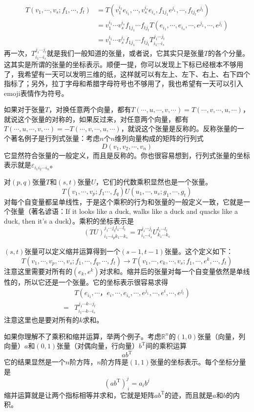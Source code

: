 \documentclass[a4paper,11pt]{ctexart}
\newcommand{\beq}{\begin{equation}}
\newcommand{\eeq}{\end{equation}}
\newcommand{\bea}{\begin{equation}\begin{aligned}}
\newcommand{\eea}{\end{aligned}\end{equation}}
\newcommand{\reals}{\mathbb{R}}
\begin{document}
\bea
T(v_1,\cdots,v_s;f_1,\cdots,f_t) &= T(v_1^{i_1}e_{i_1},\cdots,v_s^{i_s}e_{i_s},f_{1{j_1}}e^{j_1},\cdots,f_{t{j_t}}e^{j_t})\\
&=v_1^{i_1}\cdots v_s^{i_s}  f_{1{j_1}} \cdots f_{t{j_t}} T(e_{i_1},\cdots,e_{i_s},\cdots,e^{j_1},\cdots,e^{j_t}) \\
&= v_1^{i_1}\cdots v_s^{i_s}  f_{1{j_1}} \cdots f_{t{j_t}}T_{i_1 \cdots i_s}^{j_1 \cdots j_t}
\eea
再一次，$T_{i_1 \cdots i_s}^{j_1 \cdots j_t}$就是我们一般知道的张量，或者说，它其实只是张量$T$的各个分量。这其实是所谓的张量的坐标表示。顺便一提，你可以发现上下标已经根本不够用了，我希望有一天可以发明三维的纸，这样就可以有左上、左下、右上、右下四个指标了；另外，拉丁字母和希腊字母符号也不够用了，我也希望有一天可以引入emoji表情作为符号。
\par
如果对于张量$T$，对换任意两个向量，都有$T(\cdots,u,\cdots,v,\cdots) = T(\cdots,v,\cdots,u,\cdots)$，就说这个张量的对称的，如果反过来，对任意两个向量，都有$T(\cdots,u,\cdots,v,\cdots) = - T(\cdots,v,\cdots,u,\cdots)$，就说这个张量是反称的。反称张量的一个著名例子是行列式张量：考虑$n$个$n$维列向量构成的矩阵的行列式
\beq
D(v_1,v_2,\cdots,v_n)
\eeq
它显然符合张量的一般定义，而且是反称的。你也很容易想到，行列式张量的坐标表示就是$\varepsilon_{i_1 i_2 \cdots i_n}$。\par
对$(p,q)$张量$T$和$(s,t)$张量$U$，它们的代数乘积显然也是一个张量。
\beq
T(v_1,\cdots,v_p;f_1\cdots,f_q) U(u_1,\cdots,u_s;g_1,\cdots,g_t)
\eeq
对每个自变量都呈单线性，于是这个乘积的行为和张量的一般定义一致，它就是一个张量（著名谚语：If it looks like a duck, walks like a duck and quacks like a duck, then it's a duck）。乘积的坐标表示是
\beq
(TU)_{i_1 \cdots i_p k_1  \cdots k_s}^{j_1 \cdots j_q l_1 \cdots l_t} = T_{i_1 \cdots i_s}^{j_1 \cdots j_t} U_{k_1  \cdots k_s}^{l_1 \cdots l_t}
\eeq
\par
$(s,t)$张量可以定义缩并运算得到一个$(s-1,t-1)$张量。这个定义如下：
\beq
T(v_1,\cdots,v_p,\cdots,v_s;f_1,\cdots,f_q,\cdots,f_t) \to T(v_1,\cdots,e_k,\cdots,v_s;f_1,\cdots,e^k,\cdots,f_t)
\eeq
注意这里需要对所有的$(e_k,e^k)$对求和。缩并后的张量对每一个自变量依然是单线性的，所以它还是一个张量。它的坐标表示很容易求得
\bea
&T(e_{i_1},\cdots，e_i,\cdots,e_{i_s},\cdots,e^{j_1},\cdots,e^i,\cdots,e^{j_t}) \\
= &T_{i_1 \cdots k \cdots  i_s}^{j_1 \cdots k \cdots j_t}
\eea
注意这里也是要对所有的$k$求和。
\par
如果你理解不了乘积和缩并运算，举两个例子。考虑$\reals^n$的$(1,0)$张量（向量，列向量）$a$和$(0,1)$张量（对偶向量，行向量）$b^\mathrm{T}$间的乘积运算
\beq
ab^\mathrm{T}
\eeq
它的结果显然是一个$n$阶方阵，$n$阶方阵是$(1,1)$张量的坐标表示。每个坐标分量是
\beq
(ab^\mathrm{T})^j_{\ i} = a_i b^j
\eeq
缩并运算就是让两个指标相等并求和，它就是矩阵$ab^\mathrm{T}$的迹，而且就是$a$和$b$的内积。
\end{document}
